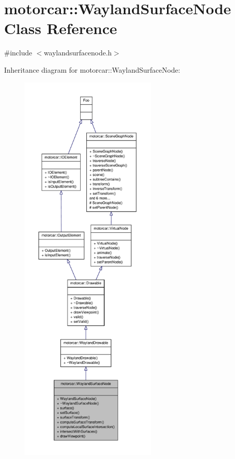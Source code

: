 \hypertarget{classmotorcar_1_1WaylandSurfaceNode}{\section{motorcar\-:\-:Wayland\-Surface\-Node Class Reference}
\label{classmotorcar_1_1WaylandSurfaceNode}
}


{\ttfamily \#include $<$waylandsurfacenode.\-h$>$}



Inheritance diagram for motorcar\-:\-:Wayland\-Surface\-Node\-:
\nopagebreak
\begin{figure}[H]
\begin{center}
\leavevmode
\includegraphics[height=550pt]{classmotorcar_1_1WaylandSurfaceNode__inherit__graph}
\end{center}
\end{figure}



